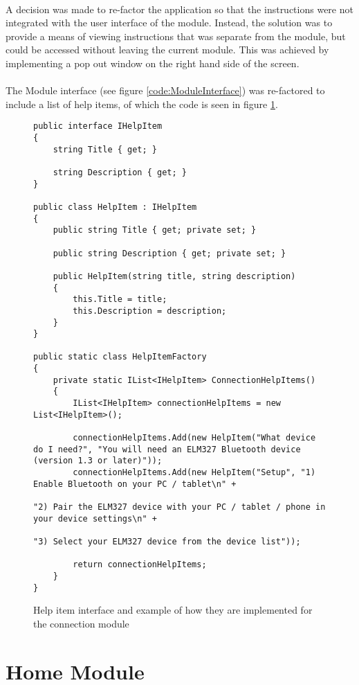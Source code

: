 		\paragraph{}{
		A decision was made to re-factor the application so that the instructions were not integrated with the user interface of the module. Instead, the solution was to provide a means of viewing instructions that was separate from the module, but could be accessed without leaving the current module. This was achieved by implementing a pop out window on the right hand side of the screen.
		}
		\paragraph{}{
		The Module interface (see figure \ref{code:ModuleInterface}) was re-factored to include a list of help items, of which the code is seen in figure \ref{code:HelpItem}.
		}
		\begin{figure}[h]
			\begin{lstlisting}
public interface IHelpItem
{
    string Title { get; }

	string Description { get; }
}

public class HelpItem : IHelpItem
{
	public string Title { get; private set; }

	public string Description { get; private set; }

	public HelpItem(string title, string description)
	{
		this.Title = title;
		this.Description = description;
	}
}

public static class HelpItemFactory
{
	private static IList<IHelpItem> ConnectionHelpItems()
	{
    	IList<IHelpItem> connectionHelpItems = new List<IHelpItem>();

		connectionHelpItems.Add(new HelpItem("What device do I need?", "You will need an ELM327 Bluetooth device (version 1.3 or later)"));
        connectionHelpItems.Add(new HelpItem("Setup", "1) Enable Bluetooth on your PC / tablet\n" +
                                                          "2) Pair the ELM327 device with your PC / tablet / phone in your device settings\n" +
                                                          "3) Select your ELM327 device from the device list"));

    	return connectionHelpItems;
	}	
}
			\end{lstlisting}
			\caption{Help item interface and example of how they are implemented for the connection module}
			\label{code:HelpItem}
		\end{figure}
	
\section{Home Module}
		\paragraph{}{
		}
	
